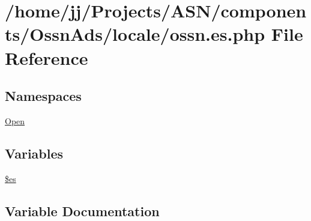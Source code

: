 \hypertarget{components_2_ossn_ads_2locale_2ossn_8es_8php}{}\section{/home/jj/\+Projects/\+A\+S\+N/components/\+Ossn\+Ads/locale/ossn.es.\+php File Reference}
\label{components_2_ossn_ads_2locale_2ossn_8es_8php}
\subsection*{Namespaces}
\begin{DoxyCompactItemize}
\item 
 \hyperlink{namespace_open}{Open}
\end{DoxyCompactItemize}
\subsection*{Variables}
\begin{DoxyCompactItemize}
\item 
\hyperlink{components_2_ossn_ads_2locale_2ossn_8es_8php_a388cbda27103d2baee3997798d1f2744}{\$es}
\end{DoxyCompactItemize}


\subsection{Variable Documentation}
